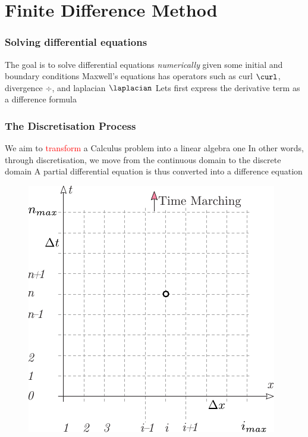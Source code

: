 \documentclass[10pt]{beamer}
\begin{document}
\section{Finite Difference Method}
\begin{frame}
    \frametitle{Solving differential equations}
    \begin{outline}
        \1 The goal is to solve differential equations \textit{numerically} given some initial and boundary conditions
        \1 Maxwell's equations has operators such as curl $\curl$, divergence $\div$, and laplacian $\laplacian$
        \1 Lets first express the derivative term as a difference formula
    \end{outline}

\end{frame}

\begin{frame}
    \frametitle{The Discretisation Process}

    \begin{outline}
        \1 We aim to \textcolor{red}{transform} a Calculus problem into a linear algebra one
        \1 In other words, through discretisation, we move from the continuous domain to the discrete domain
        \1 A partial differential equation is thus converted into a difference equation
    \end{outline}
    \begin{figure}[htbp]
        \centering
        \includegraphics[width=.45\textwidth]{time_marching.pdf}

    \end{figure}

\end{frame}
\end{document}
